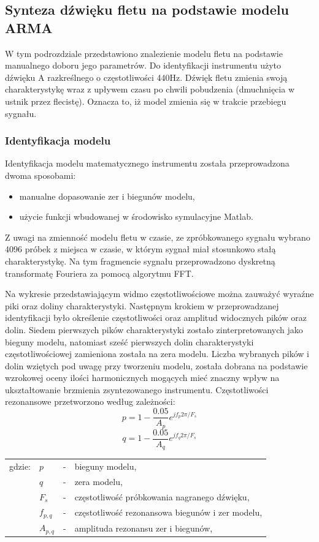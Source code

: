 \subsection{Synteza dźwięku fletu na podstawie modelu ARMA}
W tym podrozdziale przedstawiono znalezienie modelu fletu na podstawie manualnego doboru jego parametrów. Do identyfikacji instrumentu użyto dźwięku A razkreślnego o częstotliwości 440Hz. Dźwięk fletu zmienia swoją charakterystykę wraz z upływem czasu po chwili pobudzenia (dmuchnięcia w ustnik przez flecistę). Oznacza to, iż model zmienia się w trakcie przebiegu sygnału.

\subsubsection{Identyfikacja modelu}
Identyfikacja modelu matematycznego instrumentu została przeprowadzona dwoma sposobami: 
\begin{itemize}
	\item manualne dopasowanie zer i biegunów modelu, 
	\item użycie funkcji wbudowanej w środowisko symulacyjne Matlab.
\end{itemize}

Z uwagi na zmienność modelu fletu w czasie, ze zpróbkowanego sygnału wybrano 4096 próbek z miejsca w czasie, w którym sygnał miał stosunkowo stałą charakterystykę. Na tym fragmencie sygnału przeprowadzono dyskretną transformatę Fouriera za pomocą algorytmu FFT.


Na wykresie przedstawiającym widmo częstotliwościowe można zauważyć wyraźne piki oraz doliny charakterystyki. Następnym krokiem w przeprowadzanej identyfikacji było określenie częstotliwości oraz amplitud widocznych pików oraz dolin. Siedem pierwszych pików charakterystyki zostało zinterpretowanych jako bieguny modelu, natomiast sześć pierwszych dolin charakterystyki częstotliwościowej zamieniona została na zera modelu. Liczba wybranych pików i dolin wziętych pod uwagę przy tworzeniu modelu, została dobrana na podstawie wzrokowej oceny ilości harmonicznych mogących mieć znaczny wpływ na ukształtowanie brzmienia zsyntezowanego instrumentu. Częstotliwości rezonansowe przetworzono według zależności:
\begin{equation} \label{equ:wzor3}
p = 1-\frac{0.05}{A_{p}}e^{jf_{p}2\pi/F_{s}}
\end{equation}
\begin{equation} \label{equ:wzor4}
q = 1-\frac{0.05}{A_{q}}e^{jf_{q}2\pi/F_{s}}
\end{equation}
\begin{tabular}{ l l l l}
	gdzie: & $p$ &  - & bieguny modelu, \\
	&	$q$ & - &  zera modelu, \\
	&	$F_{s}$ & - &  częstotliwość próbkowania nagranego dźwięku,\\
	&	$f_{p,q}$ & - &  częstotliwość rezonansowa biegunów i zer modelu, \\
	&	$A_{p,q}$ & - &  amplituda rezonansu zer i biegunów, \\
\end{tabular} 
\vspace{6pt}

